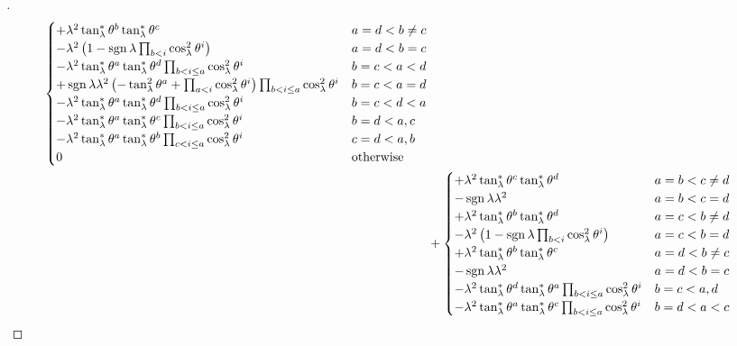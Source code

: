 \documentclass[../main.tex]{subfiles}
\begin{document}
\begin{proof}[]
\begin{align*}
\begin{cases}
+\lambda^2\tan_\lambda^\ast\tensor{\theta}{^b}\tan_\lambda^\ast\tensor{\theta}{^c}
&\text{$a=d<b\ne c$}\\
-\lambda^2
\left(
1
-\sign{\lambda}\prod_{b<i}\cos_\lambda^2\tensor{\theta}{^i}
\right)
&\text{$a=d<b=c$}\\
-\lambda^2\tan_\lambda^\ast\tensor{\theta}{^a}\tan_\lambda^\ast\tensor{\theta}{^d}\prod_{b<i\le a}\cos_\lambda^2\tensor{\theta}{^i}
&\text{$b=c<a<d$}\\
+\sign{\lambda}\lambda^2
\left(
-\tan_\lambda^2\tensor{\theta}{^a}
+\prod_{a<i}\cos_\lambda^2\tensor{\theta}{^i}
\right)
\prod_{b<i\le a}\cos_\lambda^2\tensor{\theta}{^i}
&\text{$b=c<a=d$}\\
-\lambda^2\tan_\lambda^\ast\tensor{\theta}{^a}\tan_\lambda^\ast\tensor{\theta}{^d}\prod_{b<i\le a}{\cos_\lambda^2\tensor{\theta}{^i}}
&\text{$b=c<d<a$}\\
-\lambda^2\tan_\lambda^\ast\tensor{\theta}{^a}\tan_\lambda^\ast\tensor{\theta}{^c}\prod_{b<i\le a}\cos_\lambda^2\tensor{\theta}{^i}
&\text{$b=d<a,c$}\\
-\lambda^2\tan_\lambda^\ast\tensor{\theta}{^a}\tan_\lambda^\ast\tensor{\theta}{^b}\prod_{c<i\le a}\cos_\lambda^2\tensor{\theta}{^i}
&\text{$c=d<a,b$}\\
0&\text{otherwise}\\
\end{cases}\\
&+\begin{cases}
+\lambda^2\tan_\lambda^\ast\tensor{\theta}{^c}\tan_\lambda^\ast\tensor{\theta}{^d}
&\text{$a=b<c\ne d$}\\
-\sign{\lambda}\lambda^2
&\text{$a=b<c=d$}\\
+\lambda^2\tan_\lambda^\ast\tensor{\theta}{^b}\tan_\lambda^\ast\tensor{\theta}{^d}
&\text{$a=c<b\ne d$}\\
-\lambda^2
\left(
1
-\sign{\lambda}\prod_{b<i}\cos_\lambda^2\tensor{\theta}{^i}
\right)
&\text{$a=c<b=d$}\\
+\lambda^2\tan_\lambda^\ast\tensor{\theta}{^b}\tan_\lambda^\ast\tensor{\theta}{^c}
&\text{$a=d<b\ne c$}\\
-\sign{\lambda}\lambda^2
&\text{$a=d<b=c$}\\
-\lambda^2\tan_\lambda^\ast\tensor{\theta}{^d}\tan_\lambda^\ast\tensor{\theta}{^a}\prod_{b<i\le a}\cos_\lambda^2\tensor{\theta}{^i}
&\text{$b=c<a,d$}\\
-\lambda^2\tan_\lambda^\ast\tensor{\theta}{^a}\tan_\lambda^\ast\tensor{\theta}{^c}\prod_{b<i\le a}\cos_\lambda^2\tensor{\theta}{^i}
&\text{$b=d<a<c$}\\

\end{cases}
\end{align*}
\end{proof}
\end{document}
